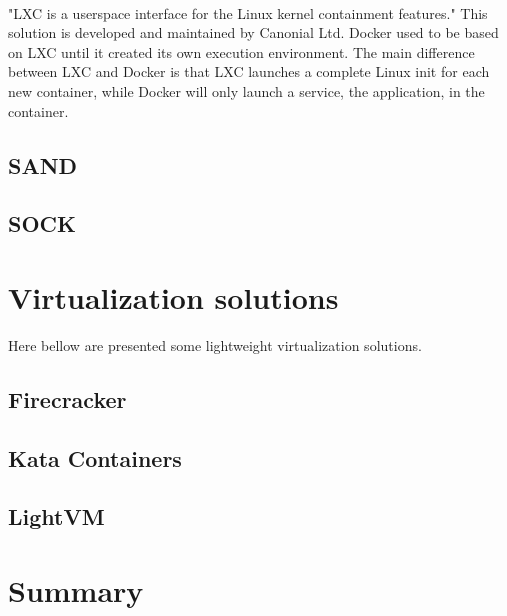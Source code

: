 \paragraph{}"LXC is a userspace interface for the Linux kernel containment features."\cite{lxc}  This solution is developed and maintained by Canonial Ltd.  Docker used to be based on LXC until it created its own execution environment.  The main difference between LXC and Docker is that LXC launches a complete Linux init for each new container, while Docker will only launch a service, the application, in the container.

\subsection{SAND} 

\subsection{SOCK} \cite{oakes2018sock}

\section{Virtualization solutions}

Here bellow are presented some lightweight virtualization solutions.

\subsection{Firecracker}
\subsection{Kata Containers}
\subsection{LightVM} \cite{manco2017my}

\section{Summary}
